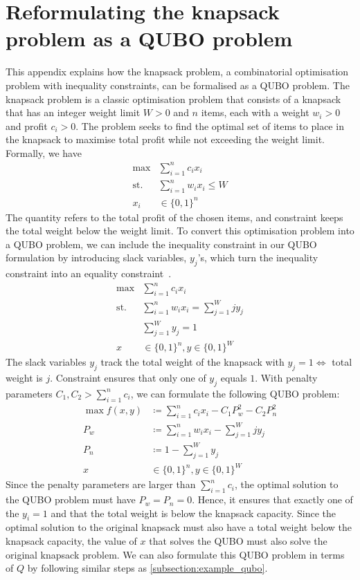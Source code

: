 \chapter{Reformulating the knapsack problem as a QUBO problem}\label{appendix:knapsack}

This appendix explains how the knapsack problem, a combinatorial optimisation problem with inequality constraints, can be formalised as a QUBO problem. The knapsack problem is a classic optimisation problem that consists of a knapsack that has an integer weight limit $W > 0$ and $n$ items, each with a weight $w_i > 0$ and profit $c_i > 0$. The problem seeks to find the optimal set of items to place in the knapsack to maximise total profit while not exceeding the weight limit. Formally, we have
\begin{align}
\max &\sum_{i=1}^n c_i x_i \label{eq:knapsack_cost}\\
\mathrm{st.} &\sum_{i=1}^n w_i x_i \leq W \label{eq:knapsack_constraint}\\
x_i &\in \{0,1\}^n \nonumber
\end{align}
The quantity  refers to the total profit of the chosen items, and constraint  keeps the total weight below the weight limit. To convert this optimisation problem into a QUBO problem, we can include the inequality constraint in our QUBO formulation by introducing slack variables, $y_j$'s, which turn the inequality constraint into an equality constraint~\cite{b6}.
\begin{align}
\max &\sum_{i=1}^n c_i x_i \\
\mathrm{st.} &\sum_{i=1}^n w_i x_i = \sum_{j=1}^W jy_j \label{eq:knapsack_slack_weight}\\
&\sum_{j=1}^W y_j = 1 \label{eq:knapsack_slack_sum}\\
x &\in \{0,1\}^n, y \in \{0,1\}^W \nonumber
\end{align}
The slack variables $y_j$ track the total weight of the knapsack with $y_j = 1 \Leftrightarrow$ total weight is $j$. Constraint  ensures that only one of $y_j$ equals $1$. With penalty parameters $C_1, C_2 > \sum_{i=1}^n c_i$, we can formulate the following QUBO problem:
\begin{align}
    \max f(x, y) &\coloneqq \sum_{i=1}^n c_i x_i - C_1 P_w^2 - C_2 P_n^2 \\
    P_w &\coloneqq \sum_{i=1}^n w_i x_i - \sum_{j=1}^W jy_j \\
    P_n &\coloneqq 1 - \sum_{j=1}^W y_j \\
    x &\in \{0,1\}^n, y \in \{0,1\}^W \nonumber
\end{align}
Since the penalty parameters are larger than $\sum_{i=1}^n c_i$, the optimal solution to the QUBO problem must have $P_w = P_n = 0$. Hence, it ensures that exactly one of the $y_i=1$ and that the total weight is below the knapsack capacity. Since the optimal solution to the original knapsack must also have a total weight below the knapsack capacity, the value of $x$ that solves the QUBO must also solve the original knapsack problem. We can also formulate this QUBO problem in terms of $Q$ by following similar steps as \autoref{subsection:example_qubo}.